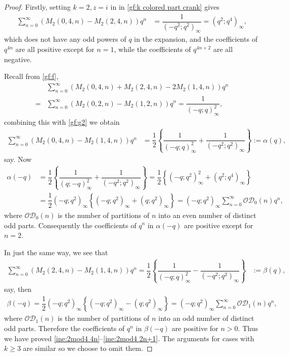 \documentclass[12pt]{amsart}
\numberwithin{equation}{section}
\theoremstyle{plain}
\theoremstyle{definition}
\begin{document}
\begin{proof}
Firstly, setting $k=2, z=i$ in in \eqref{gf:k colored part crank} gives
\begin{align}
\sum_{n=0}^{\infty}\left(M_{2}(0,4,n)-M_{2}(2,4,n)\right)q^{n} &=\dfrac{1}{(-q^{2};q^{2})_{\infty}}=(q^2;q^4)_{\infty},\label{gf:g2}
\end{align}
which does not have any odd powers of $q$ in the expansion, and the coefficients of $q^{4n}$ are all positive except for $n=1$, while the coefficients of $q^{4n+2}$ are all negative.

Recall from \eqref{gf:f},
\begin{align*}
 &\sum_{n=0}^{\infty}\left(M_{2}(0,4,n)+M_{2}(2,4,n)-2M_{2}(1,4,n)\right)q^{n}\\
 =&\sum_{n=0}^{\infty}\left(M_{2}(0,2,n)-M_{2}(1,2,n)\right)q^{n}=\dfrac{1}{(-q;q)_{\infty}^{2}},
\end{align*}
combining this with \eqref{gf:g2} we obtain
\begin{align*}
\sum_{n=0}^{\infty}\left(M_{2}(0,4,n)-M_{2}(1,4,n)\right)q^{n} &=\dfrac{1}{2}\left\{\dfrac{1}{(-q;q)_{\infty}^{2}}+\dfrac{1}{(-q^{2};q^{2})_{\infty}}\right\}:=\alpha(q),
\end{align*}
say. Now
\begin{align*}
\alpha(-q) &=\dfrac{1}{2}\left\{\dfrac{1}{(q;-q)_{\infty}^{2}}+\dfrac{1}{(-q^{2};q^{2})_{\infty}}\right\} =\dfrac{1}{2}\left\{(-q;q^{2})_{\infty}^{2}+(q^{2};q^{4})_{\infty}\right\}\\
 &=\dfrac{1}{2}(-q;q^{2})_{\infty}\left\{(-q;q^{2})_{\infty}+(q;q^{2})_{\infty}\right\}=(-q;q^{2})_{\infty}\sum_{n=0}^{\infty}
 \mathcal{OD}_{0}(n)q^{n},
\end{align*}
where $\mathcal{OD}_{0}(n)$ is the number of partitions of $n$ into an even number of distinct odd parts. Consequently the coefficients of $q^{n}$ in $\alpha(-q)$ are positive except for $n=2$.

In just the same way, we see that
\begin{align*}
\sum_{n=0}^{\infty}\left(M_{2}(2,4,n)-M_{2}(1,4,n)\right)q^{n}=\dfrac{1}{2}\left\{\dfrac{1}{(-q;q)_{\infty}^{2}}-\dfrac{1}{(-q^{2};q^{2})_{\infty}}\right\} &:=\beta(q),
\end{align*}
say, then
\begin{align*}
\beta(-q)=\dfrac{1}{2}(-q;q^{2})_{\infty}\left\{(-q;q^{2})_{\infty}-(q;q^{2})_{\infty}\right\}
=(-q;q^{2})_{\infty}\sum_{n=0}^{\infty}\mathcal{OD}_{1}(n)q^{n},
\end{align*}
where $\mathcal{OD}_{1}(n)$ is the number of partitions of $n$ into an odd number of distinct odd parts. Therefore the coefficients of $q^{n}$ in $\beta(-q)$ are positive for $n>0$. Thus we have proved \eqref{ine:2mod4 4n}--\eqref{ine:2mod4 2n+1}. The arguments for cases with $k\geq 3$ are similar so we choose to omit them.
\end{proof}
\end{document}
